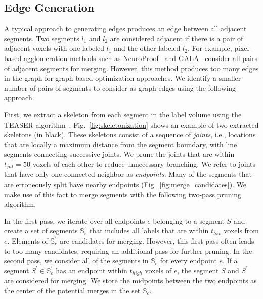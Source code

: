 \subsection{Edge Generation}

A typical approach to generating edges produces an edge between all adjacent segments. Two segments $l_1$ and $l_2$ are considered adjacent if there is a pair of adjacent voxels with one labeled $l_1$ and the other labeled $l_2$.
For example, pixel-based agglomeration methods such as NeuroProof~\cite{10.1371/journal.pone.0125825} and GALA~\cite{nunez2014graph} consider all pairs of adjacent segments for merging.
However, this method produces too many edges in the graph for graph-based optimization approaches. We identify a smaller number of pairs of segments to consider as graph edges using the following approach.

First, we extract a skeleton from each segment in the label volume using the TEASER algorithm~\cite{sato2000teasar,zhao2014automatic}. Fig.~\ref{fig:skeletonization} shows an example of two extracted skeletons (in black). These skeletons consist of a sequence of \textit{joints}, i.e., locations that are locally a maximum distance from the segment boundary, with line segments connecting successive joints. We prune the joints that are within $t_{jnt} = 50$ voxels of each other to reduce unnecessary branching. We refer to joints that have only one connected neighbor as \textit{endpoints}. Many of the segments that are erroneously split have nearby endpoints  (Fig.~\ref{fig:merge_candidates}). We make use of this fact to merge segments with the following two-pass pruning algorithm.

In the first pass, we iterate over all endpoints $e$ belonging to a segment $S$ and create a set of segments $\mathbb{S}_e^\prime$ that includes all labels that are within $t_{low}$ voxels from $e$. Elements of $\mathbb{S}_e^\prime$ are candidates for merging. However, this first pass often leads to too many candidates, requiring an additional pass for further pruning. In the second pass, we consider all of the segments in $\mathbb{S}_e^\prime$ for every endpoint $e$. If a segment $S^\prime \in \mathbb{S}_e^\prime$ has an endpoint within $t_{high}$ voxels of $e$, the segment $S$ and $S^\prime$ are considered for merging. We store the midpoints between the two endpoints as the center of the potential merges in the set $\mathbb{S}_c$.

